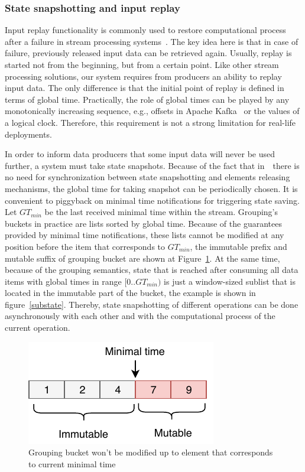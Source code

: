 \subsubsection{State snapshotting and input replay}

Input replay functionality is commonly used to restore computational process after a failure in stream processing systems~\cite{Carbone:2017:SMA:3137765.3137777, Akidau:2013:MFS:2536222.2536229, apache:storm}. The key idea here is that in case of failure, previously released input data can be retrieved again. Usually, replay is started not from the beginning, but from a certain point. Like other stream processing solutions, our system requires from producers an ability to replay input data. The only difference is that the initial point of replay is defined in terms of global time. Practically, the role of global times can be played by any monotonically increasing sequence, e.g., offsets in Apache Kafka~\cite{kreps2011kafka} or the values of a logical clock. Therefore, this requirement is not a strong limitation for real-life deployments.

In order to inform data producers that some input data will never be used further, a system must take state snapshots. Because of the fact that in~\FlameStream\ there is no need for synchronization between state snapshotting and elements releasing mechanisms, the global time for taking snapshot can be periodically chosen. It is convenient to piggyback on minimal time notifications for triggering state saving. Let $GT_{min}$ be the last received minimal time within the stream. Grouping's buckets in practice are lists sorted by global time. Because of the guarantees provided by minimal time notifications, these lists cannot be modified at any position before the item that corresponds to $GT_{min}$, the immutable prefix and mutable suffix of grouping bucket are shown at Figure~\ref{immutable}. At the same time, because of the grouping semantics, state that is reached after consuming all data items with global times in range $[0..GT_{min})$ is just a window-sized sublist that is located in the immutable part of the bucket, the example is shown in figure~\ref{substate}. Thereby, state snapshotting of different operations can be done asynchronously with each other and with the computational process of the current operation. 

\begin{figure}[htbp]
  \centering
  \includegraphics[width=.3\textwidth]{pics/immutable}
  \caption{Grouping bucket won't be modified up to element that corresponds to current minimal time}
  \label {immutable}
\end{figure}

